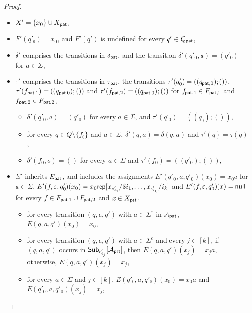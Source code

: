 \begin{proof}
\begin{itemize}
            \item  $X' = \{x_0\} \cup X_{\mathsf{pat}}$,
            \item $F'(q'_0) = x_0$, and $F'(q')$ is undefined for every $q' \in Q_{\mathsf{pat}}$,
            \item $\delta'$ comprises the transitions in $\delta_{\mathsf{pat}}$, and the transition $\delta'(q'_0, a) = (q'_0)$ for $a \in \Sigma$,

            \item  $\tau'$ comprises the transitions in $\tau_\pat$, the transitions $\tau'(q'_0) = ((q_{\pat, 0}); ())$, $\tau'(f_{\pat, 1}) = ((q_{\pat, 0}); ())$ and $\tau'(f_{\pat, 2}) = ((q_{\pat, 0}); ())$ for $f_{\pat, 1} \in F_{\pat, 1}$ and $f_{\pat, 2} \in F_{\pat, 2}$,
                \begin{itemize}
                    \item $\delta'(q'_0, a) = (q'_0)$ for every $a \in \Sigma$, and $\tau'(q'_0) = ((q_0); ())$,
                    \item for every $q \in Q \setminus \{f_0\}$ and $a \in \Sigma$, $\delta'(q, a) = \delta(q, a)$ and $\tau'(q) = \tau(q)$,
                    \item $\delta'(f_0, a) = ()$ for every $a \in \Sigma$ and $\tau'(f_0) = ((q'_0); ())$,
                \end{itemize}
            \item $E'$ inherits $E_\pat$, and includes the assignments $E'(q'_0, a, q'_0)(x_0)  = x_0 a$ for $a \in \Sigma$, $E'(f, \varepsilon, q'_0) (x_0) = x_0\rep[x_{e'_{i_1}}/\$i_1, \ldots, x_{e'_{i_k}}/i_k]$ and $E'(f, \varepsilon, q'_0) (x) = \nullchar$ for every  $f \in F_{\pat,1} \cup F_{\pat, 2}$ and $x \in X_\pat$.
                \begin{itemize}
                    \item for every transition $(q, a, q')$ with $a \in \Sigma^\varepsilon$ in $\cA_\pat$, $E(q, a, q')(x_0) = x_0$,
                    \item for every transition $(q, a, q')$ with $a \in \Sigma^\varepsilon$ and every $j \in [k]$,  if $(q, a, q')$ occurs in ${\sf Sub}_{e'_{i_j}}[\cA_\pat]$, then $E(q, a, q')(x_j) = x_ja$, otherwise, $E(q, a, q')(x_j) = x_j$,
                    \item  for every $a \in \Sigma$ and $j \in [k]$, $E(q'_0, a, q'_0)(x_0) = x_0a$ and $E(q'_0, a, q'_0)$$(x_j) = x_j$,
$$
\end{itemize}
\end{itemize}
\end{proof}
